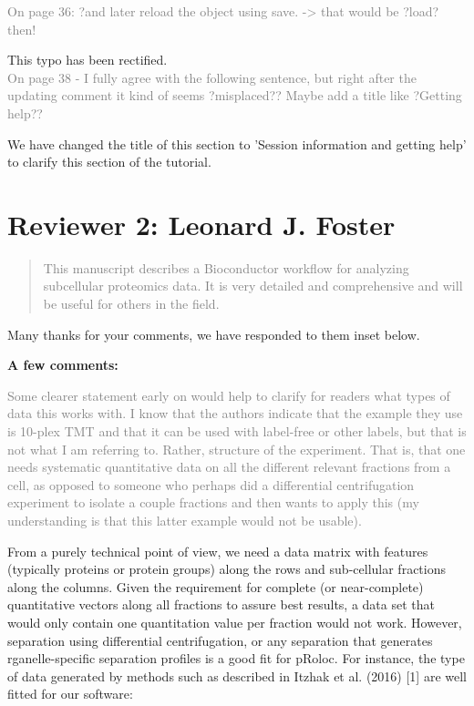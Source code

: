 \documentclass[11pt]{article}
\begin{document}
\textcolor{gray} {On page 36: ?and later reload the object using save. -> that would be ?load? then!} 
 
This typo has been rectified. \\

\textcolor{gray} {On page 38 -  I fully agree with the following sentence, but right after the updating comment it kind of seems ?misplaced?? Maybe add a title like ?Getting help??} 

We have changed the title of this section to 'Session information and getting help' to clarify this section of the tutorial. \\


\section*{Reviewer 2: Leonard J. Foster}

\begin{quote} \textcolor{gray} {This manuscript describes a Bioconductor workflow for analyzing subcellular proteomics data. It is very detailed and comprehensive and will be useful for others in the field.} \end{quote}

Many thanks for your comments, we have responded to them inset below. \\ \newline

\textbf{A few comments:}

\textcolor{gray} {Some clearer statement early on would help to clarify for readers what types of data this works with. I know that the authors indicate that the example they use is 10-plex TMT and that it can be used with label-free or other labels, but that is not what I am referring to. Rather, structure of the experiment. That is, that one needs systematic quantitative data on all the different relevant fractions from a cell, as opposed to someone who perhaps did a differential centrifugation experiment to isolate a couple fractions and then wants to apply this (my understanding is that this latter example would not be usable).} 
	
From a purely technical point of view, we need a data matrix with features (typically proteins or protein groups) along the rows and sub-cellular fractions along the columns. Given the requirement for complete (or near-complete) quantitative vectors along all fractions to assure best results, a data set that would only contain one quantitation value per fraction would not work. However, separation using differential centrifugation, or any separation that generates  rganelle-specific separation profiles is a good fit for pRoloc. For instance, the type of data generated by methods such as described in Itzhak et al. (2016) [1] are well fitted for our software: \\
\end{document}
